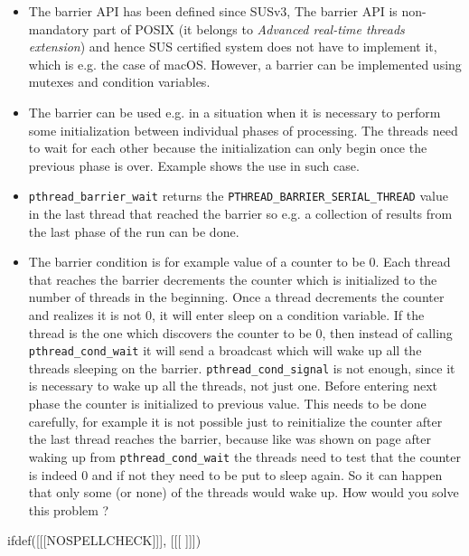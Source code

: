 \begin{itemize}
\item The barrier API has been defined since SUSv3,
The barrier API is non-mandatory part of POSIX (it belongs to
\emph{Advanced real-time threads extension}) and hence SUS certified system does
not have to implement it, which is e.g. the case of macOS.
However, a barrier can be implemented using mutexes and condition variables.
\item The barrier can be used e.g. in a situation when it is necessary to
perform some initialization between individual phases of processing.
The threads need to wait for each other because the initialization can only
begin once the previous phase is over.
Example  shows the use in such case.
\item \texttt{pthread\_barrier\_wait} returns
the \texttt{PTHREAD\_BARRIER\_SERIAL\_THREAD} value
in the last thread that reached the barrier so e.g. a collection of
results from the last phase of the run can be done.
\item The barrier condition is for example value of a counter to be 0.
Each thread that reaches the barrier decrements the counter which is
initialized to the number of threads in the beginning.
Once a thread decrements the counter and realizes it is not 0,
it will enter sleep on a condition variable.
If the thread is the one which discovers the counter to be 0, then instead of
calling \texttt{pthread\_cond\_wait} it will send a broadcast which will
wake up all the threads sleeping on the barrier.
\texttt{pthread\_cond\_signal} is not enough, since it is necessary to wake up
all the threads, not just one.
Before entering next phase the counter is initialized to previous value.
This needs to be done carefully, for example it is not possible just to
reinitialize the counter after the last thread reaches the barrier,
because like was shown on page \pageref{CONDITION_VARIABLES} after waking
up from \texttt{pthread\_cond\_wait} the threads need to test that the counter
is indeed 0 and if not they need to be put to sleep again. So it can happen
that only some (or none) of the threads would wake up.
How would you solve this problem ?
\end{itemize}



ifdef([[[NOSPELLCHECK]]], [[[
]]])

